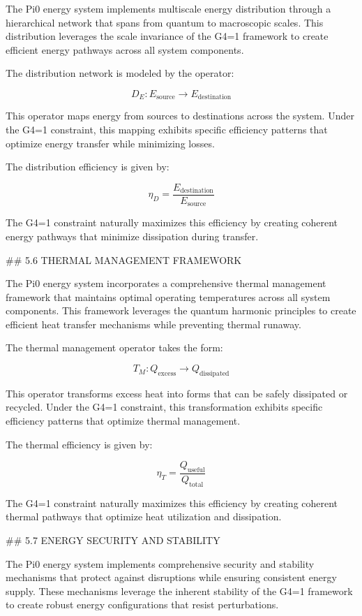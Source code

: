The Pi0 energy system implements multiscale energy distribution through a hierarchical network that spans from quantum to macroscopic scales. This distribution leverages the scale invariance of the G4=1 framework to create efficient energy pathways across all system components.

The distribution network is modeled by the operator:

$$D_E: E_{\text{source}} \rightarrow E_{\text{destination}}$$

This operator maps energy from sources to destinations across the system. Under the G4=1 constraint, this mapping exhibits specific efficiency patterns that optimize energy transfer while minimizing losses.

The distribution efficiency is given by:

$$\eta_D = \frac{E_{\text{destination}}}{E_{\text{source}}}$$

The G4=1 constraint naturally maximizes this efficiency by creating coherent energy pathways that minimize dissipation during transfer.

## 5.6 THERMAL MANAGEMENT FRAMEWORK

The Pi0 energy system incorporates a comprehensive thermal management framework that maintains optimal operating temperatures across all system components. This framework leverages the quantum harmonic principles to create efficient heat transfer mechanisms while preventing thermal runaway.

The thermal management operator takes the form:

$$T_M: Q_{\text{excess}} \rightarrow Q_{\text{dissipated}}$$

This operator transforms excess heat into forms that can be safely dissipated or recycled. Under the G4=1 constraint, this transformation exhibits specific efficiency patterns that optimize thermal management.

The thermal efficiency is given by:

$$\eta_T = \frac{Q_{\text{useful}}}{Q_{\text{total}}}$$

The G4=1 constraint naturally maximizes this efficiency by creating coherent thermal pathways that optimize heat utilization and dissipation.

## 5.7 ENERGY SECURITY AND STABILITY

The Pi0 energy system implements comprehensive security and stability mechanisms that protect against disruptions while ensuring consistent energy supply. These mechanisms leverage the inherent stability of the G4=1 framework to create robust energy configurations that resist perturbations.

